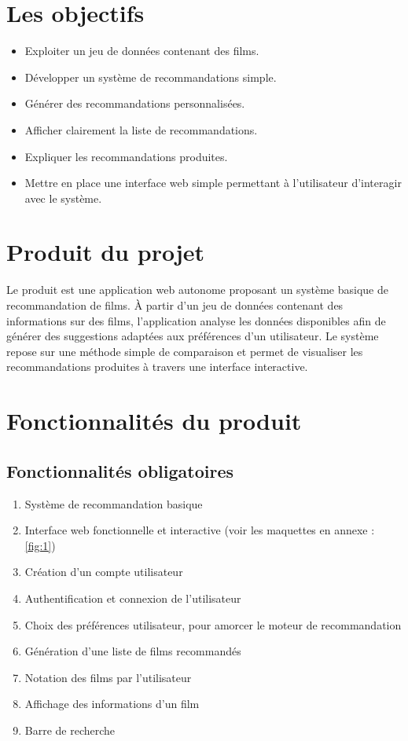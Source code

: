 \documentclass[a4paper,12pt]{report}
\begin{document}
\section{Les objectifs}
\begin{itemize}
    \item Exploiter un jeu de données contenant des films.
    \item Développer un système de recommandations simple.
    \item Générer des recommandations personnalisées.
    \item Afficher clairement la liste de recommandations.
    \item Expliquer les recommandations produites.
    \item Mettre en place une interface web simple permettant à l'utilisateur d'interagir avec le système.
\end{itemize}

\section{Produit du projet}
Le produit est une application web autonome proposant un système basique de recommandation de films. À partir d'un jeu de données contenant des informations sur des films, l'application analyse les données disponibles afin de générer des suggestions adaptées aux préférences d'un utilisateur.
Le système repose sur une méthode simple de comparaison et permet de visualiser les recommandations produites à travers une interface interactive.

\section{Fonctionnalités du produit}
\label{fnct}
\subsection{Fonctionnalités obligatoires}
\begin{enumerate}[label=FR-0\arabic*, leftmargin=1.7cm]
    \item Système de recommandation basique
    \item Interface web fonctionnelle et interactive (voir les maquettes en annexe : \ref{fig:1})
    \item Création d'un compte utilisateur
    \item Authentification et connexion de l'utilisateur
    \item Choix des préférences utilisateur, pour amorcer le moteur de recommandation
    \item Génération d'une liste de films recommandés 
    \item Notation des films par l'utilisateur
    \item Affichage des informations d'un film
    \item Barre de recherche
\end{enumerate}
\end{document}
